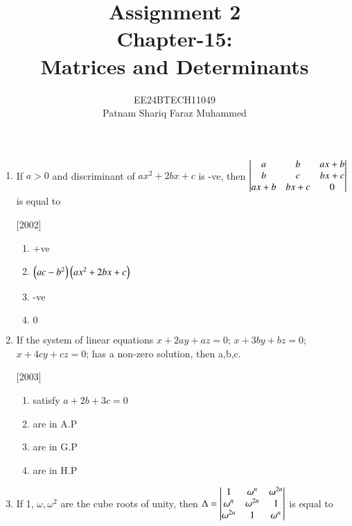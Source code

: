 \documentclass[journal]{IEEEtran}
\numberwithin{equation}{enumi}
\numberwithin{figure}{enumi}
\begin{document}


\title{Assignment 2 \\ Chapter-15: \\ Matrices and Determinants}
\author{EE24BTECH11049 \\ Patnam Shariq Faraz Muhammed}

{\let\newpage\relax\maketitle}

\begin{enumerate}

\item
	If $a>0$ and discriminant of $ax^{2}+2bx+c$ is -ve, then
	$\begin{vmatrix}a & b & ax+b \\ b & c & bx+c \\ ax+b & bx+c & 0\end{vmatrix}$ is equal to 
	
	\hfill[2002]	

	\begin{enumerate}
		\item +ve
		\item $\left(ac-b^2\right)\left(ax^2+2bx+c\right)$
		\item -ve
		\item $0$
	\end{enumerate}

\item
	If the system of linear equations $x+2ay+az = 0$; $x+3by+bz = 0$; $x+4cy+cz = 0$; has a non-zero solution, then a,b,c.

	\hfill[2003]

	\begin{enumerate}
                \item satisfy $a+ 2b+3c = 0$
                \item are in A.P
                \item are in G.P
                \item are in H.P
        \end{enumerate} 	

\item                    
	If 1, $\omega, \omega^{2}$ are the cube roots of unity, then
	$\Delta = \begin{vmatrix}1 & \omega^{n} & \omega^{2n} \\ \omega^{n} & \omega^{2n} & 1 \\ \omega^{2n} & 1 & \omega^{n}\end{vmatrix}$ is equal to 
        

\end{enumerate}
\end{document}
